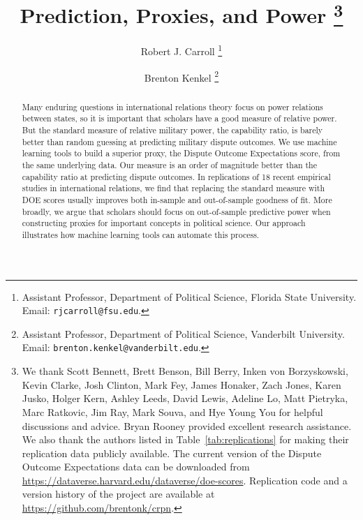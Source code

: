 \documentclass[11pt,oneside]{article}
\title{
  Prediction, Proxies, and Power%
  \thanks{%
    We thank Scott Bennett, Brett Benson, Bill Berry, Inken von Borzyskowski, Kevin Clarke, Josh Clinton, Mark Fey, James Honaker, Zach Jones, Karen Jusko, Holger Kern, Ashley Leeds, David Lewis, Adeline Lo, Matt Pietryka, Marc Ratkovic, Jim Ray, Mark Souva, and Hye Young You for helpful discussions and advice.
    Bryan Rooney provided excellent research assistance.
    We also thank the authors listed in Table~\ref{tab:replications} for making their replication data publicly available.
    The current version of the Dispute Outcome Expectations data can be downloaded from \url{https://dataverse.harvard.edu/dataverse/doe-scores}.
    Replication code and a version history of the project are available at \url{https://github.com/brentonk/crpn}.
  }%
}
\author{%
  Robert J. Carroll%
  \thanks{%
    Assistant Professor, Department of Political Science, Florida State University.  Email:  \nolinkurl{rjcarroll@fsu.edu}.
  }%
  \and%
  Brenton Kenkel%
  \thanks{
    Assistant Professor, Department of Political Science, Vanderbilt University.
    Email: \nolinkurl{brenton.kenkel@vanderbilt.edu}.
  }%
}
\begin{document}
\maketitle

\begin{abstract}
  \noindent
  Many enduring questions in international relations theory focus on power relations between states, so it is important that scholars have a good measure of relative power.
  But the standard measure of relative military power, the capability ratio, is barely better than random guessing at predicting military dispute outcomes.
  We use machine learning tools to build a superior proxy, the Dispute Outcome Expectations score, from the same underlying data.
  Our measure is an order of magnitude better than the capability ratio at predicting dispute outcomes.
  In replications of 18 recent empirical studies in international relations, we find that replacing the standard measure with DOE scores usually improves both in-sample and out-of-sample goodness of fit.
  More broadly, we argue that scholars should focus on out-of-sample predictive power when constructing proxies for important concepts in political science.
  Our approach illustrates how machine learning tools can automate this process.
\end{abstract}
\thispagestyle{empty}
\newpage
\setcounter{page}{1}



















\newpage




\clearpage
\appendix

\end{document}
